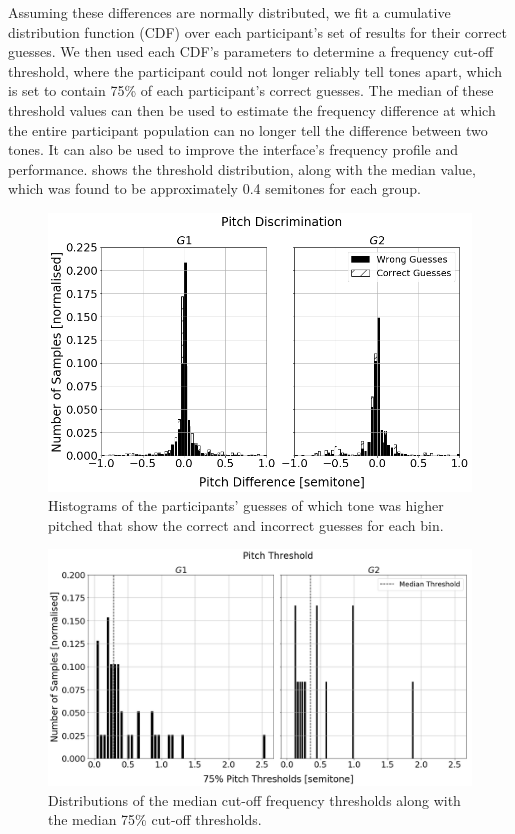 \documentclass[]{interact}
\begin{document}
Assuming these differences are normally distributed, we fit a cumulative distribution function (CDF) over each participant's set of results for their correct guesses.
We then used each CDF's parameters to determine a frequency cut-off threshold, where the participant could not longer reliably tell tones apart, which is set to contain 75\% of each participant's correct guesses.
The median of these threshold values can then be used to estimate the frequency difference at which the entire participant population can no longer tell the difference between two tones. It can also be used to improve the interface's frequency profile and performance. 
 shows the threshold distribution, along with the median value,
which was found to be approximately 0.4 semitones for each group.

\begin{figure}
  \centering
  \includegraphics[width=1.0\textwidth]{figures/pitch_discrimination.png}
  \caption{Histograms of the participants' guesses of which tone was higher pitched that show the correct and incorrect guesses for each bin. }\label{fig:pitch-discrimination}
\end{figure}

\begin{figure}
  \centering
  \includegraphics[width=1.0\textwidth]{figures/pitch_thresholds.png}
  \caption{Distributions of the median cut-off frequency thresholds along with the median 75\% cut-off thresholds. }\label{fig:pitch-thresholds}
\end{figure}
\end{document}
